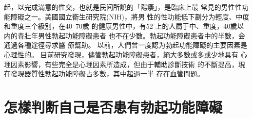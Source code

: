 \documentclass[12pt,UTF8]{ctexbook}
\begin{document}
起，以完成滿意的性交，也就是民间所說的「陽痿」，是臨床上最
常見的男性性功能障礙之一。美國國立衛生研究院(NIH)，將男
性的性功能低下劃分为輕度、中度和重度三个級別，在40~70歲
的健康男性中，有52%
上的人屬于中、重度，40歲以内的青壯年男性勃起功能障礙患者
也不在少數。勃起功能障礙患者中的半數，会通過各種途徑尋求醫
療幫助。
以前，人們曾一度認为勃起功能障礙的主要因素是心理性的。
目前研究發現，儘管勃起功能障礙患者，絕大多數或多或少地具有
心理因素影響，有些完全是心理因素所造成，但由于輔助診斷技術
的不斷提高，現在發現器質性勃起功能障礙占多數，其中超過一半
存在血管問題。

\section{怎樣判断自己是否患有勃起功能障礙}
\end{document}
